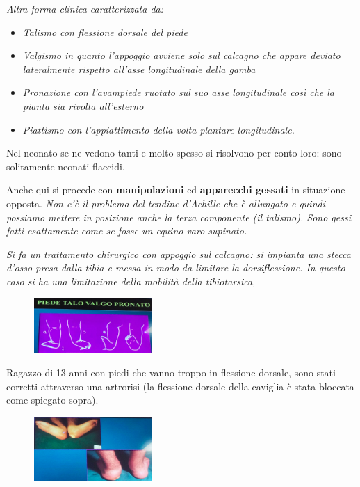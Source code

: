 \emph{Altra forma clinica caratterizzata da:}

\begin{itemize}
\item
  \emph{Talismo con flessione dorsale del piede}
\item
  \emph{Valgismo in quanto l'appoggio avviene solo sul calcagno che appare deviato lateralmente rispetto all'asse longitudinale della gamba}
\item
  \emph{Pronazione con l'avampiede ruotato sul suo asse longitudinale così che la pianta sia rivolta all'esterno }
\item
  \emph{Piattismo con l'appiattimento della volta plantare longitudinale.}
\end{itemize}

Nel neonato se ne vedono tanti e molto spesso si risolvono per conto loro: sono solitamente neonati flaccidi.

Anche qui si procede con \textbf{manipolazioni} ed \textbf{apparecchi gessati} in situazione opposta. \emph{Non c'è il problema del tendine d'Achille che è allungato e quindi possiamo mettere in posizione anche la terza componente (il talismo). Sono gessi fatti esattamente come se fosse un equino varo supinato.}

\emph{Si fa un trattamento chirurgico con appoggio sul calcagno: si impianta una stecca d'osso presa dalla tibia e messa in modo da limitare la dorsiflessione. In questo caso si ha una limitazione della mobilità della tibiotarsica,}

\begin{figure}[!ht]
\centering
\includegraphics[width=0.4\textwidth]{016/image40.png}
\end{figure}

Ragazzo di 13 anni con piedi che vanno troppo in flessione dorsale, sono stati corretti attraverso una artrorisi (la flessione dorsale della caviglia è stata bloccata come spiegato sopra).

\begin{figure}[!ht]
\centering
\includegraphics[width=0.4\textwidth]{016/image41.png}
\end{figure}

